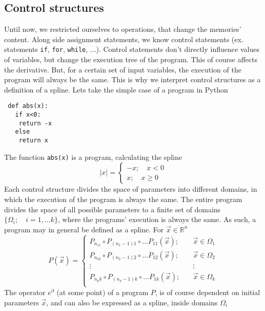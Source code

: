 \documentclass{article}
\newcommand{\RR}{\mathbb{R}}
\newcommand{\D}{\partial}
\begin{document}
 \subsection{Control structures}
 
 Until now, we restricted ourselves to operations, that change the memories' content. Along side assignment statements, we know control statements (ex. statements \texttt{if},
  \texttt{for}, \texttt{while}, ...). Control statements don't directly influence values of variables, but change the execution tree of the program. This of course affects the derivative. But, for a certain set of input variables, the execution of the program will always be the same. This is why we interpret control structures as a definition of a spline. Lets take the simple case of a program in Python
 \begin{verbatim}
 def abs(x):
   if x<0:
    return -x
   else
    return x
 \end{verbatim}
 The function \texttt{abs(x)} is a program, calculating the spline
 \begin{equation}
   \label{eq:zlepek}
   |x| =
   \begin{cases}
     -x;\quad x<0\\
     x;\quad x\ge 0
   \end{cases}
 \end{equation}
 Each control structure divides the space of parameters into different domains, in which the execution of the program is always the same. The entire program divides the space of all possible parameters to a finite set of domains $\{\Omega_i;\quad i=1,\ldots
  k\}$, where the programs' execution is always the same. As such, a program may in general be defined as a spline. For $\vec{x}\in\RR^n$
 \begin{equation}
   \label{eq:zlrprk_splosno}
   P(\vec{x}) =
   \begin{cases}
     P_{n_11}\circ P_{(n_1-1)1}\circ\ldots P_{11}(\vec{x});&\quad \vec{x}\in\Omega_1\\
     P_{n_22}\circ P_{(n_2-1)2}\circ\ldots P_{12}(\vec{x});&\quad \vec{x}\in\Omega_2\\
     \vdots&\quad\vdots\\
     P_{n_kk}\circ P_{(n_k-1)k}\circ\ldots P_{1k}(\vec{x});&\quad \vec{x}\in\Omega_k\\
   \end{cases}
 \end{equation}
 The operator $e^\D$ (at some point) of a program $P$, is of course dependent on initial parameters $\vec{x}$, and can also be expressed as a spline, inside domains $\Omega_i$
\end{document}
